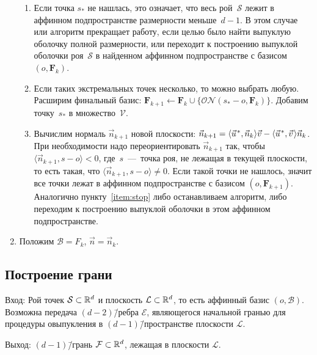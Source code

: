 \documentclass[a4paper,12pt]{article}
\newcommand{\R}[1][]{%
  \ifthenelse{\equal{#1}{}}%
  {\mathbb{R}}%
  {\mathbb{R}^{#1}}}
\newcommand{\Swarm}{\mathcal{S}}              %
\newcommand{\Facet}{\mathcal{F}}              %
\newcommand{\Edge}{\mathcal{E}}               %
\newcommand{\Basis}{\mathcal{B}}              %
\newcommand{\Viewed}{\mathcal{V}}             %
\newcommand{\set}[2][]{#1\{ #2 #1\}}                    %
\newcommand{\scalprod}[3][]{#1\langle #2, #3 #1\rangle} %
\newcommand{\ONorm}[3][]{\mathcal{ON}#1( #2, #3 #1)} %
\newcommand{\FinalVec}{\mathbf{F}} %
\newcommand{\Plane}{\mathcal{L}}           %
\renewcommand{\.}{\hspace{0.2ex}}
\begin{document}
\begin{enumerate}
\begin{enumerate}
        \item Если точка $s_*$ не нашлась, это означает, что весь рой~$\Swarm$ лежит в аффинном подпространстве размерности меньше~$d-1$. В этом случае или алгоритм прекращает работу, если целью было найти выпуклую оболочку полной размерности, или переходит к построению выпуклой оболочки роя~$\Swarm$ в найденном аффинном подпространстве с базисом $(o, \FinalVec_k)$.
        \label{item:stop}

        \item  Если таких экстремальных точек несколько, то можно выбрать любую. Расширим финальный базис: $\FinalVec_{k+1} \leftarrow \FinalVec_k \cup \set[\big]{\ONorm{s_* - o}{\FinalVec_k}}$. Добавим точку~$s_*$ в множество~$\Viewed$.

        \item Вычислим нормаль $\vec n_{k+1}$ новой плоскости: $\vec n_{k+1} = \scalprod{\vec u\.^*}{\vec n_k}\vec v - \scalprod{\vec u\.^*}{\vec v \.}\vec n_k$. При необходимости надо переориентировать $\vec n_{k+1}$ так, чтобы $\scalprod{\vec n_{k+1}}{s - o} < 0$, где~$s$~---~точка роя, не лежащая в текущей плоскости, то есть такая, что $\scalprod{\vec n_{k+1}}{s - o} \neq 0$. Если такой точки не нашлось, значит все точки лежат в аффинном подпространстве с базисом $(o, \FinalVec_{k+1})$. Аналогично пункту~\ref{item:stop} либо останавливаем алгоритм, либо переходим к построению выпуклой оболочки в этом аффинном подпространстве.



      \end{enumerate}
      \item Положим $\Basis = F_k$, $\vec n = \vec n_k$.
    \end{enumerate}

  \subsection{Построение грани}
    \label{subsec:FacetConstruction}

    Вход: Рой точек $\Swarm \subset \R[d]$ и плоскость $\Plane \subset \R[d]$, то есть аффинный базис $(o, \Basis)$. Возможна передача $(d-2)$\=/ребра $\Edge$, являющегося начальной гранью для процедуры овыпукления в $(d-1)$\=/пространстве плоскости $\Plane$.

    Выход: $(d-1)$\=/грань $\Facet \subset \R[d]$, лежащая в плоскости $\Plane$.
\end{document}
